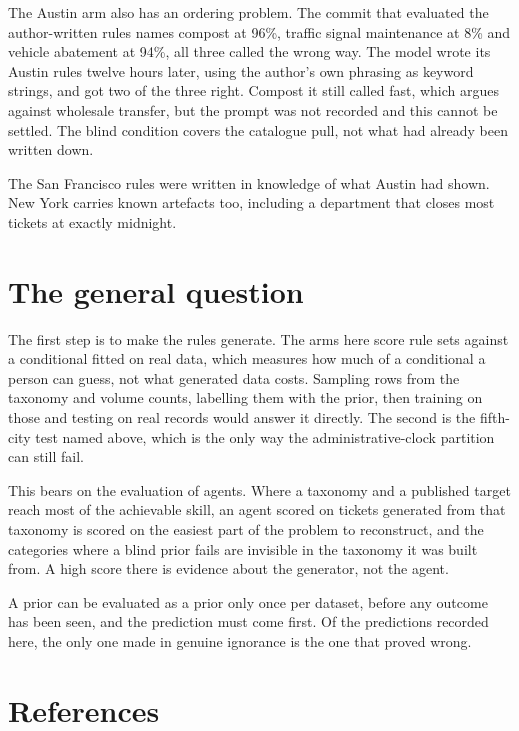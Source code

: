 \documentclass[10pt,a4paper,twocolumn]{article}
\begin{document}
The Austin arm also has an ordering problem. The commit that evaluated the
author-written rules names compost at 96\%, traffic signal maintenance at 8\% and
vehicle abatement at 94\%, all three called the wrong way. The model wrote its
Austin rules twelve hours later, using the author's own phrasing as keyword
strings, and got two of the three right. Compost it still called fast, which
argues against wholesale transfer, but the prompt was not recorded and this
cannot be settled. The blind condition covers the catalogue pull, not what had
already been written down.

The San Francisco rules were written in knowledge of what Austin had shown. New
York carries known artefacts too, including a department that closes most
tickets at exactly midnight.

\section*{The general question}

The first step is to make the rules generate. The arms here score rule sets
against a conditional fitted on real data, which measures how much of a
conditional a person can guess, not what generated data costs. Sampling rows
from the taxonomy and volume counts, labelling them with the prior, then
training on those and testing on real records would answer it directly. The
second is the fifth-city test named above, which is the only way the
administrative-clock partition can still fail.

This bears on the evaluation of agents. Where a taxonomy and a published target
reach most of the achievable skill, an agent scored on tickets generated from
that taxonomy is scored on the easiest part of the problem to reconstruct, and
the categories where a blind prior fails are invisible in the taxonomy it was
built from. A high score there is evidence about the generator, not the agent.

A prior can be evaluated as a prior only once per dataset, before any outcome
has been seen, and the prediction must come first. Of the predictions recorded
here, the only one made in genuine ignorance is the one that proved wrong.

\section*{References}
\footnotesize\setlength{\parindent}{0pt}\setlength{\parskip}{0.05em}
\end{document}
